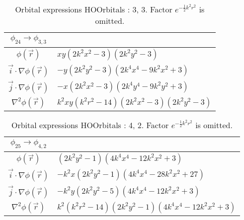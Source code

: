 \begin{table}
\begin{center}
\begin{tabular}{c|l}
$\phi_{24} \rightarrow \phi_{3, 3}$\\
\hline
$\phi(\vec r)$ & $x y \left(2 k^{2} x^{2} -3\right) \left(2 k^{2} y^{2} -3\right)$\\
\hline
$\vec i\cdot \nabla \phi(\vec r)$ & $- y \left(2 k^{2} y^{2} -3\right) \left(2 k^{4} x^{4} - 9 k^{2} x^{2} + 3\right)$\\
$\vec j\cdot \nabla \phi(\vec r)$ & $- x \left(2 k^{2} x^{2} -3\right) \left(2 k^{4} y^{4} - 9 k^{2} y^{2} + 3\right)$\\
\hline
$\nabla^2 \phi(\vec r)$ & $k^{2} x y \left(k^{2} r^{2} -14\right) \left(2 k^{2} x^{2} -3\right) \left(2 k^{2} y^{2} -3\right)$\\
\end{tabular}
\caption{Orbital expressions HOOrbitals : 3, 3. Factor $e^{- \frac{1}{2} k^{2} r^{2}}$ is omitted.}
\end{center}
\end{table}

\clearpage

\begin{table}
\begin{center}
\begin{tabular}{c|l}
$\phi_{25} \rightarrow \phi_{4, 2}$\\
\hline
$\phi(\vec r)$ & $\left(2 k^{2} y^{2} -1\right) \left(4 k^{4} x^{4} - 12 k^{2} x^{2} + 3\right)$\\
\hline
$\vec i\cdot \nabla \phi(\vec r)$ & $- k^{2} x \left(2 k^{2} y^{2} -1\right) \left(4 k^{4} x^{4} - 28 k^{2} x^{2} + 27\right)$\\
$\vec j\cdot \nabla \phi(\vec r)$ & $- k^{2} y \left(2 k^{2} y^{2} -5\right) \left(4 k^{4} x^{4} - 12 k^{2} x^{2} + 3\right)$\\
\hline
$\nabla^2 \phi(\vec r)$ & $k^{2} \left(k^{2} r^{2} -14\right) \left(2 k^{2} y^{2} -1\right) \left(4 k^{4} x^{4} - 12 k^{2} x^{2} + 3\right)$\\
\end{tabular}
\caption{Orbital expressions HOOrbitals : 4, 2. Factor $e^{- \frac{1}{2} k^{2} r^{2}}$ is omitted.}
\end{center}
\end{table}


